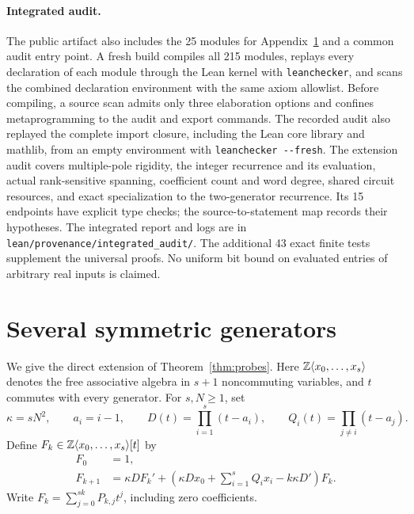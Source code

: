 \documentclass[11pt,letterpaper]{article}
\theoremstyle{definition}\newtheorem{definition}[theorem]{Definition}
\theoremstyle{remark}\newtheorem{remark}[theorem]{Remark}
\begin{document}
\paragraph{Integrated audit.}
The public artifact also includes the 25 modules for Appendix~\ref{sec:multi}
and a common audit entry point. A fresh build compiles all 215 modules,
replays every declaration of each module through the Lean kernel with
\texttt{leanchecker}, and scans the combined declaration environment with
the same axiom allowlist. Before compiling, a source scan admits only three
elaboration options and confines metaprogramming to the audit and export
commands. The recorded audit also replayed the complete import closure,
including the Lean core library and mathlib, from an empty environment with
\texttt{leanchecker -{}-fresh}.
The extension audit covers multiple-pole rigidity, the integer recurrence
and its evaluation, actual rank-sensitive spanning, coefficient count and
word degree, shared circuit resources, and exact specialization to the
two-generator recurrence. Its 15 endpoints have explicit type checks;
the source-to-statement map records their hypotheses. The integrated report
and logs are in \texttt{lean/provenance/integrated\_audit/}.
The additional 43 exact finite tests supplement the universal proofs.
No uniform bit bound on evaluated entries of arbitrary real inputs is claimed.

\section{Several symmetric generators}\label{sec:multi}
We give the direct extension of Theorem~\ref{thm:probes}. Here
$\mathbb Z\langle x_0,\ldots,x_s\rangle$ denotes the free associative algebra
in $s+1$ noncommuting variables, and $t$ commutes with every generator.
For $s,N\ge1$, set
\[
\kappa=sN^2,\qquad a_i=i-1,\qquad
D(t)=\prod_{i=1}^s(t-a_i),\qquad Q_i(t)=\prod_{j\ne i}(t-a_j).
\]
Define $F_k\in\mathbb Z\langle x_0,\ldots,x_s\rangle[t]$ by
\begin{equation}\label{eq:multi-recurrence}
\begin{aligned}
F_0&=1,\\
F_{k+1}&=\kappa D F_k'
 +\left(\kappa D x_0+\sum_{i=1}^sQ_ix_i-k\kappa D'\right)F_k.
\end{aligned}
\end{equation}
Write $F_k=\sum_{j=0}^{sk}P_{k,j}t^j$, including zero coefficients.
\end{document}
